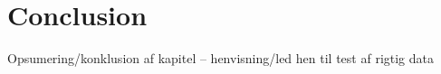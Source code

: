 \section{Conclusion}
Opsumering/konklusion af kapitel -- henvisning/led hen til test af rigtig data


